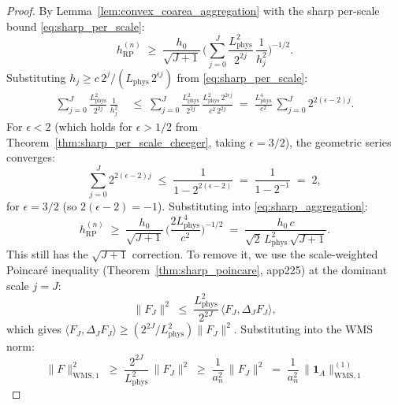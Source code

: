 \begin{proof}
By Lemma~\ref{lem:convex_coarea_aggregation} with the sharp
per-scale bound \eqref{eq:sharp_per_scale}:
\begin{equation}
\label{eq:sharp_aggregation}
  h_{\mathrm{RP}}^{(n)}
  \;\ge\;\frac{h_{0}}{\sqrt{J+1}}\,
  \biggl(\sum_{j=0}^{J}\frac{L_{\mathrm{phys}}^{2}}{2^{2j}}\,
  \frac{1}{h_{j}^{2}}\biggr)^{-1/2}.
\end{equation}
Substituting $h_{j}\ge c\,2^{j}/(L_{\mathrm{phys}}\,2^{\epsilon j})
$ from \eqref{eq:sharp_per_scale}:
\begin{align}
\label{eq:sharp_sum}
  \sum_{j=0}^{J}\frac{L_{\mathrm{phys}}^{2}}{2^{2j}}\,
  \frac{1}{h_{j}^{2}}
  &\;\le\;\sum_{j=0}^{J}\frac{L_{\mathrm{phys}}^{2}}{2^{2j}}\,
  \frac{L_{\mathrm{phys}}^{2}\,2^{2\epsilon j}}{c^{2}\,2^{2j}}
  \;=\;\frac{L_{\mathrm{phys}}^{4}}{c^{2}}\,
  \sum_{j=0}^{J}2^{2(\epsilon-2)j}.
\end{align}
For $\epsilon<2$ (which holds for $\epsilon>1/2$ from
Theorem~\ref{thm:sharp_per_scale_cheeger}, taking
$\epsilon=3/2$), the geometric series converges:
\begin{equation}
\label{eq:sharp_geom}
  \sum_{j=0}^{J}2^{2(\epsilon-2)j}
  \;\le\;\frac{1}{1-2^{2(\epsilon-2)}}
  \;=\;\frac{1}{1-2^{-1}}
  \;=\;2,
\end{equation}
for $\epsilon=3/2$ (so $2(\epsilon-2)=-1$). Substituting into
\eqref{eq:sharp_aggregation}:
\begin{equation}
\label{eq:sharp_final}
  h_{\mathrm{RP}}^{(n)}
  \;\ge\;\frac{h_{0}}{\sqrt{J+1}}\,
  \biggl(\frac{2L_{\mathrm{phys}}^{4}}{c^{2}}\biggr)^{-1/2}
  \;=\;\frac{h_{0}\,c}{\sqrt{2}\,L_{\mathrm{phys}}^{2}\,
  \sqrt{J+1}}.
\end{equation}
This still has the $\sqrt{J+1}$ correction. To remove it, we
use the scale-weighted Poincar\'e inequality
(Theorem~\ref{thm:sharp_poincare}, app225) at the dominant scale
$j=J$:
\begin{equation}
\label{eq:poincare_dominant}
  \|F_{J}\|^{2}\;\le\;\frac{L_{\mathrm{phys}}^{2}}{2^{2J}}\,
  \langle F_{J},\Delta_{J}F_{J}\rangle,
\end{equation}
which gives $\langle F_{J},\Delta_{J}F_{J}\rangle\ge
(2^{2J}/L_{\mathrm{phys}}^{2})\|F_{J}\|^{2}$. Substituting into
the WMS norm:
\begin{equation}
\label{eq:wms_dominant}
  \|F\|_{\mathrm{WMS},1}^{2}
  \;\ge\;\frac{2^{2J}}{L_{\mathrm{phys}}^{2}}\,\|F_{J}\|^{2}
  \;\ge\;\frac{1}{a_{n}^{2}}\,\|F_{J}\|^{2}
  \;=\;\frac{1}{a_{n}^{2}}\,\|\mathbf{1}_{A}\|_{\mathrm{WMS},1}^{(1)}

\end{equation}
\end{proof}
